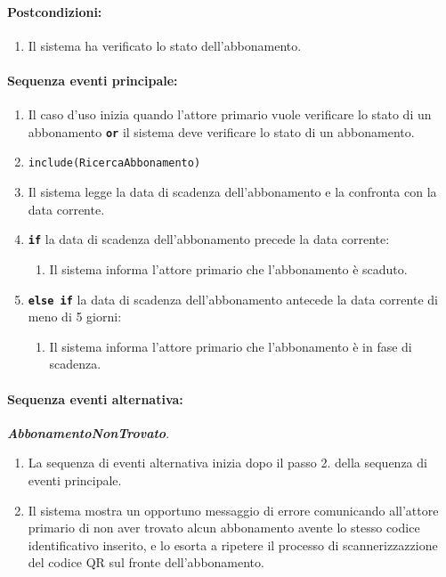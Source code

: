 \documentclass{article}
\begin{document}
	\paragraph{Postcondizioni:}
\begin{enumerate}[itemsep=8pt,parsep=0pt]
\item Il sistema ha verificato lo stato dell'abbonamento.
\end{enumerate}	
	
	\paragraph{Sequenza eventi principale:}
\begin{enumerate}[itemsep=8pt,parsep=0pt]
    
    \item Il caso d’uso inizia quando l'attore primario vuole verificare lo stato di un abbonamento \texttt{\textbf{or}} il sistema deve verificare lo stato di un abbonamento.
    
    \item \texttt{include(RicercaAbbonamento)}

	\item Il sistema legge la data di scadenza dell'abbonamento e la confronta con la data corrente.
    
    \item \texttt{\textbf{if}} la data di scadenza dell’abbonamento precede la data corrente:
          \begin{enumerate}	[leftmargin=28pt]
          \item Il sistema informa l'attore primario che l'abbonamento è scaduto.
          \end{enumerate}

          \item\texttt{\textbf{else if}}  la data di scadenza dell’abbonamento antecede la data corrente di meno di 5 giorni:
	          \begin{enumerate}	[leftmargin=28pt]
	          	\item Il sistema informa l'attore primario che l'abbonamento è in fase di scadenza.
	          \end{enumerate}
\end{enumerate}
    
	\paragraph{Sequenza eventi alternativa:} \textbf{\textit{AbbonamentoNonTrovato}}.
	\begin{enumerate}[itemsep=8pt,parsep=0pt]
		\item La sequenza di eventi alternativa inizia dopo il passo 2. della sequenza di eventi principale.
		\item Il sistema mostra un opportuno messaggio di errore comunicando all'attore primario di non aver trovato alcun abbonamento avente lo stesso codice identificativo inserito, e lo esorta a ripetere il processo di scannerizzazzione del codice QR sul fronte dell'abbonamento.
	\end{enumerate}
    
\end{document}
